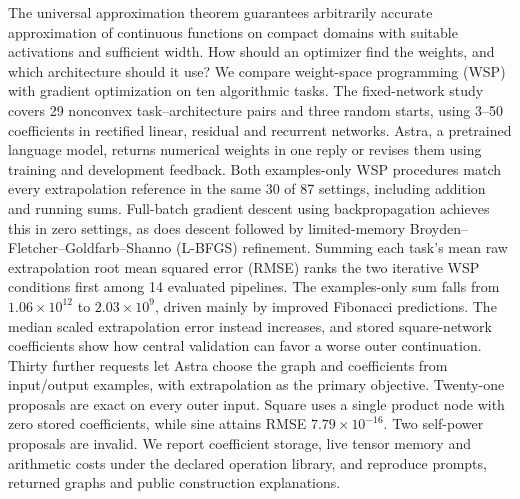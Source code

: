 The universal approximation theorem guarantees arbitrarily accurate approximation of continuous functions on compact domains with suitable activations and sufficient width. How should an optimizer find the weights, and which architecture should it use? We compare weight-space programming (WSP) with gradient optimization on ten algorithmic tasks. The fixed-network study covers 29 nonconvex task--architecture pairs and three random starts, using 3--50 coefficients in rectified linear, residual and recurrent networks. Astra, a pretrained language model, returns numerical weights in one reply or revises them using training and development feedback. Both examples-only WSP procedures match every extrapolation reference in the same 30 of 87 settings, including addition and running sums. Full-batch gradient descent using backpropagation achieves this in zero settings, as does descent followed by limited-memory Broyden--Fletcher--Goldfarb--Shanno (L-BFGS) refinement. Summing each task's mean raw extrapolation root mean squared error (RMSE) ranks the two iterative WSP conditions first among 14 evaluated pipelines. The examples-only sum falls from $1.06\times10^{12}$ to $2.03\times10^9$, driven mainly by improved Fibonacci predictions. The median scaled extrapolation error instead increases, and stored square-network coefficients show how central validation can favor a worse outer continuation. Thirty further requests let Astra choose the graph and coefficients from input/output examples, with extrapolation as the primary objective. Twenty-one proposals are exact on every outer input. Square uses a single product node with zero stored coefficients, while sine attains RMSE $7.79\times10^{-16}$. Two self-power proposals are invalid. We report coefficient storage, live tensor memory and arithmetic costs under the declared operation library, and reproduce prompts, returned graphs and public construction explanations.

